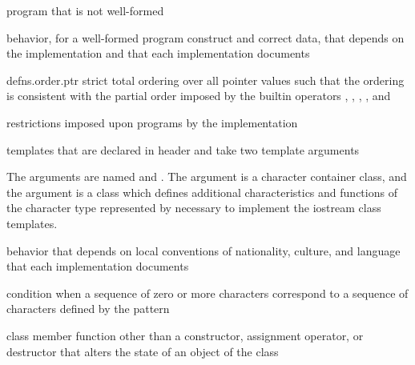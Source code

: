 %
program that is not well-formed

%
behavior, for a well-formed program construct and correct data, that
depends on the implementation and that each implementation documents

{defns.order.ptr}
%
strict total ordering over all pointer values
such that the ordering is consistent with the partial order
imposed by the builtin operators
\tcode{<}, \tcode{>}, \tcode{<=}, \tcode{>=}, and \tcode{<=>}

%
restrictions imposed upon programs by the implementation

templates that are declared in header  and
take two template arguments

\begin{defnote}
The arguments are named  and .
The argument  is a character container class, and
the argument  is a class
which defines additional characteristics and functions
of the character type represented by 
necessary to implement the iostream class templates.
\end{defnote}

%
behavior that depends on local conventions of nationality, culture, and
language that each implementation documents

%
%
condition when a sequence of zero or more characters
correspond to a sequence of characters defined by the pattern

%
class member function other than a constructor,
assignment operator, or destructor
that alters the state of an object of the class

